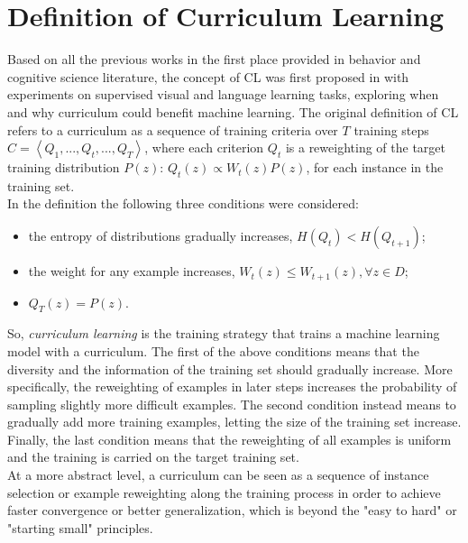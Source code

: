 \section{Definition of Curriculum Learning}\label{chapter:defCL}
Based on all the previous works in the first place provided in behavior and 
cognitive science literature, the concept of CL was first proposed in \cite{bengio2009curriculum} with 
experiments on supervised visual and language learning tasks, exploring when and why curriculum could benefit machine learning.
The original definition of CL refers to a curriculum as a sequence of training criteria 
over \(T\) training steps \( C = \left \langle Q_1, ..., Q_t, ..., Q_T \right \rangle\), where each  
criterion \(Q_t\) is a reweighting of the target training distribution \(P(z)\): \(Q_t(z) \propto W_t(z)P(z)\), for 
each instance in the training set.\\ In the definition the following three conditions were considered:
\begin{itemize}
    \item the entropy of distributions gradually increases, \(H(Q_t) < H(Q_{t+1})\);
    \item the weight for any example increases, \(W_t(z) \leq W_{t+1}(z),  \forall z \in D\);
    \item \(Q_T(z) = P(z)\).
\end{itemize}
So, \textit{curriculum learning} is the training strategy that trains a machine learning model
with a curriculum. The first of the above conditions means that the diversity 
and the information of the training set should gradually increase. More specifically,
the reweighting of examples in later steps increases the probability of sampling slightly more difficult examples.
The second condition instead means to gradually add more training examples, letting the size of the training set increase. 
Finally, the last condition
means that the reweighting of all examples is uniform and the training is carried on the target training set.\\
At a more abstract level, a curriculum can be seen as a sequence of instance selection or example reweighting along the training process in order to achieve faster convergence or better generalization, 
which is beyond the "easy to hard" or "starting small" principles. 

